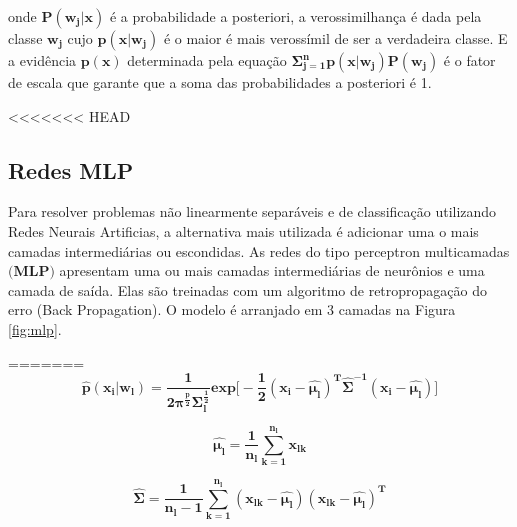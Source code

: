 \documentclass[12pt]{article}
\begin{document}
onde $\mathbf{P(w_j\vert x)}$ é a probabilidade a posteriori, a verossimilhança  é dada pela classe $\mathbf{w_j}$ cujo $\mathbf{p(x\vert w_j)}$ é o maior é mais verossímil de ser a verdadeira classe. E a evidência $\mathbf{p(x)}$ determinada pela equação $\mathbf{\Sigma_{j=1}^{n} p(x\vert w_j) P(w_j)}$ é o fator de escala que garante que a
soma das probabilidades a posteriori é 1.

<<<<<<< HEAD
\subsection{Redes MLP}

Para resolver problemas não linearmente separáveis e de classificação utilizando Redes Neurais Artificias, a alternativa mais utilizada é adicionar uma o mais camadas intermediárias ou escondidas. As redes do tipo perceptron multicamadas $\textbf{(MLP)}$ apresentam uma ou mais camadas intermediárias de neurônios e uma camada de saída. Elas são treinadas com um algoritmo de retropropagação do erro (Back Propagation). O modelo é arranjado em 3 camadas na Figura \ref{fig:mlp}.

=======
\begin{equation}
\mathbf{\hat{p}(x_i\vert w_l)= \dfrac{1}{2\pi^\frac{p}{2}\Sigma_{l}^{\frac{1}{2}}}exp\Bigg[ -\frac{1}{2}(x_i- \hat{\mu_{l}})^{T}\hat{\Sigma}^{-1}(x_i-\hat{\mu_{l}}) \Bigg ]  }
\end{equation}

\begin{equation}
\mathbf{\hat{\mu_{l}}= \dfrac{1}{n_l} \sum_{k=1}^{n_l} x_{lk} }
\end{equation}

\begin{equation}
\mathbf{\hat{\Sigma}= \dfrac{1}{n_l-1} \sum_{k=1}^{n_l} (x_{lk}-\hat{\mu_l}) (x_{lk}-\hat{\mu_l})^T }
\end{equation}
\end{document}

